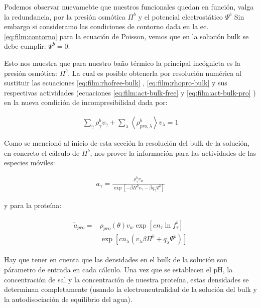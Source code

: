 Podemos observar nuevamebte que nuestros funcionales quedan en funci\'on, valga la redundancia, por la presi\'on osm\'otica $\Pi^b$ y el potencial electrost\'atico $\Psi^b$
Sin embargo si consideramo las condiciones de contorno dada en la ec. \ref{eq:film:contorno} para la ecuaci\'on de Poisson, vemos que en la soluci\'on bulk se debe cumplir: $\Psi^b = 0$. 

Esto nos muestra que para nuestro ba\~no t\'ermico la principal inc\'ognicta es la presi\'on osm\'otica: $\Pi^b$.
La cual es posible obtenerla por resoluci\'on num\'erica al sustituir las ecuaciones  \ref{eq:film:rhofree-bulk} ,  \ref{eq:film:rhopro-bulk}  y sus respectivas actividades (ecuaciones \ref{eq:film:act-bulk-free} y \ref{eq:film:act-bulk-pro} ) en la nueva condici\'on de incompresibilidad dada por:

\begin{align}
	\sum_\gamma \rho^b_\gamma v_\gamma + \sum_\lambda\left< \rho^b_{pro,\lambda}\right> v_\lambda = 1
	\label{eq:incom-bulk}
\end{align}

Como se mencion\'o al inicio de esta secci\'on la resoluci\'on del bulk de la soluci\'on, en concreto el c\'alculo de $\Pi^b$, nos provee la informaci\'on para las actividades de las especies m\'oviles:

\begin{align}
	a_\gamma =\frac{\rho^b_\gamma v_w}{\exp\left[-\beta \Pi^b v_\gamma - \beta q_\gamma\Psi^b\right]}
	\label{eq:film:act-bulk-free}
\end{align}

 y para la prote\'ina:

\begin{align}
	\begin{aligned}
		\tilde{a}_{pro} = & \rho_{pro}(\theta)v_w\exp\left[cn_\tau \ln f^b_\tau\right] \\
		& \exp \left[cn_\lambda (v_\lambda\beta\Pi^b + q_\lambda \Psi^b) \right]
	\end{aligned}
\label{eq:film:act-bulk-pro}
\end{align}


Hay que tener en cuenta que las densidades en el bulk de la soluci\'on son p\'arametro de entrada en cada c\'alculo. Una vez que se establecen el pH, la concentraci\'on de sal y la concentraci\'on de nuestra prote\'ina, estas densidades se determinan completamente (usando la electroneutralidad de la soluci\'on del bulk y la autodisociaci\'on de equilibrio del agua).

